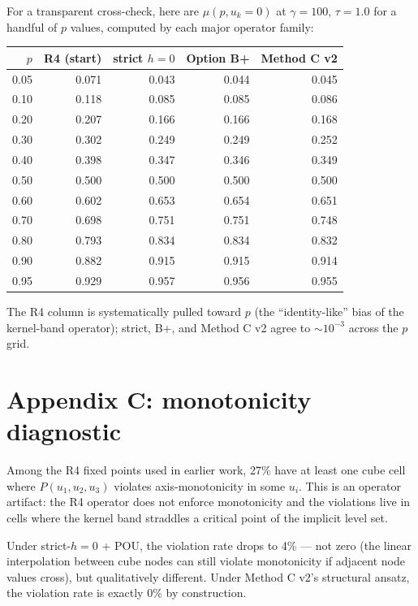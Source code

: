 \documentclass[11pt]{article}
\begin{document}
For a transparent cross-check, here are $\mu(p, u_k = 0)$ at
$\gamma = 100$, $\tau = 1.0$ for a handful of $p$ values, computed by
each major operator family:

\begin{center}\small\begin{tabular}{rrrrr}\toprule
$p$ & R4 (start) & strict $h{=}0$ & Option B+ & Method C v2 \\
\midrule
0.05 & 0.071 & 0.043 & 0.044 & 0.045 \\
0.10 & 0.118 & 0.085 & 0.085 & 0.086 \\
0.20 & 0.207 & 0.166 & 0.166 & 0.168 \\
0.30 & 0.302 & 0.249 & 0.249 & 0.252 \\
0.40 & 0.398 & 0.347 & 0.346 & 0.349 \\
0.50 & 0.500 & 0.500 & 0.500 & 0.500 \\
0.60 & 0.602 & 0.653 & 0.654 & 0.651 \\
0.70 & 0.698 & 0.751 & 0.751 & 0.748 \\
0.80 & 0.793 & 0.834 & 0.834 & 0.832 \\
0.90 & 0.882 & 0.915 & 0.915 & 0.914 \\
0.95 & 0.929 & 0.957 & 0.956 & 0.955 \\
\bottomrule\end{tabular}\end{center}

The R4 column is systematically pulled toward $p$ (the ``identity-like''
bias of the kernel-band operator); strict, B+, and Method C v2 agree
to $\sim 10^{-3}$ across the $p$ grid.

\section{Appendix C: monotonicity diagnostic}

Among the R4 fixed points used in earlier work, 27\% have at least one
cube cell where $P(u_1, u_2, u_3)$ violates axis-monotonicity in some
$u_i$. This is an operator artifact: the R4 operator does not enforce
monotonicity and the violations live in cells where the kernel band
straddles a critical point of the implicit level set.

Under strict-$h{=}0$ + POU, the violation rate drops to 4\% --- not
zero (the linear interpolation between cube nodes can still violate
monotonicity if adjacent node values cross), but qualitatively
different. Under Method C v2's structural ansatz, the violation
rate is exactly 0\% by construction.
\end{document}
